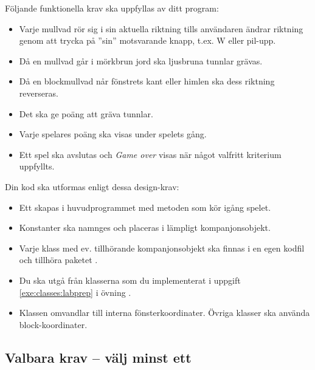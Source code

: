 Följande funktionella krav ska uppfyllas av ditt program:
\begin{itemize}[nosep, label={$\square$},]
\item Varje mullvad rör sig i sin aktuella riktning tills användaren ändrar riktning genom att trycka på ''sin'' motsvarande knapp, t.ex. W eller pil-upp.
\item Då en mullvad går i mörkbrun jord ska ljusbruna tunnlar grävas.
\item Då en blockmullvad når fönstrets kant eller himlen ska dess riktning reverseras.
\item Det ska ge poäng att gräva tunnlar.
\item Varje spelares poäng ska visas under spelets gång.
\item Ett spel ska avslutas och \emph{Game over} visas när något valfritt kriterium uppfyllts.
\end{itemize}

\noindent Din kod ska utformas enligt dessa design-krav:
\begin{itemize}[nosep, label={$\square$}]
\item Ett  skapas i huvudprogrammet med metoden  som kör igång spelet.
\item Konstanter ska namnges och placeras i lämpligt kompanjonsobjekt.
\item Varje klass med ev. tillhörande kompanjonsobjekt ska finnas i en egen kodfil och tillhöra paketet .
\item Du ska utgå från klasserna som du implementerat i uppgift \ref{exe:classes:labprep} i övning \texttt{\ExeWeekFIVE}.
\item Klassen  omvandlar till interna fönsterkoordinater. Övriga klasser ska använda block-koordinater.
\end{itemize}


\subsection{Valbara krav -- välj minst ett}


